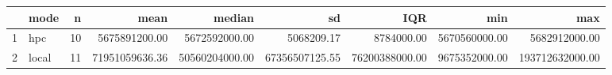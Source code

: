 \begin{table}[ht]
\centering
\begin{tabular}{rlrrrrrrr}
  \hline
 & mode & n & mean & median & sd & IQR & min & max \\ 
  \hline
1 & hpc &  10 & 5675891200.00 & 5672592000.00 & 5068209.17 & 8784000.00 & 5670560000.00 & 5682912000.00 \\ 
  2 & local &  11 & 71951059636.36 & 50560204000.00 & 67356507125.55 & 76200388000.00 & 9675352000.00 & 193712632000.00 \\ 
   \hline
\end{tabular}
\end{table}
